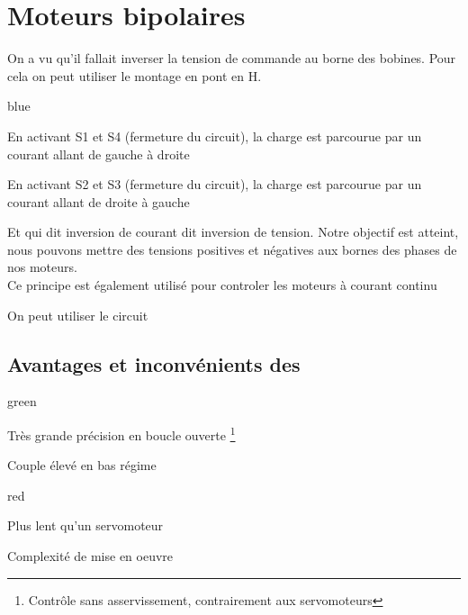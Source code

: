 

\section{Moteurs bipolaires}

On a vu qu'il fallait inverser la tension de commande au borne des bobines. Pour cela on peut utiliser le montage en pont en H.


\begin{items}{blue}{\Bullet}
  \item En activant S1 et S4 (fermeture du circuit), la charge est parcourue par un courant allant de gauche à droite
  \item En activant S2 et S3 (fermeture du circuit), la charge est parcourue par un courant allant de droite à gauche
\end{items}

Et qui dit inversion de courant dit inversion de tension. Notre objectif est atteint, nous pouvons mettre des tensions positives et négatives aux bornes des phases de nos moteurs.\\

Ce principe est également utilisé pour controler les moteurs à courant continu

On peut utiliser le circuit 


\subsection{Avantages et inconvénients des \paps}

\begin{items}{green}{\Bullet}
    \item Très grande précision en boucle ouverte \footnote{Contrôle sans asservissement, contrairement aux servomoteurs}
    \item Couple élevé en bas régime
\end{items}

\begin{items}{red}{\Bullet}
  \item Plus lent qu'un servomoteur
  \item Complexité de mise en oeuvre
\end{items}


